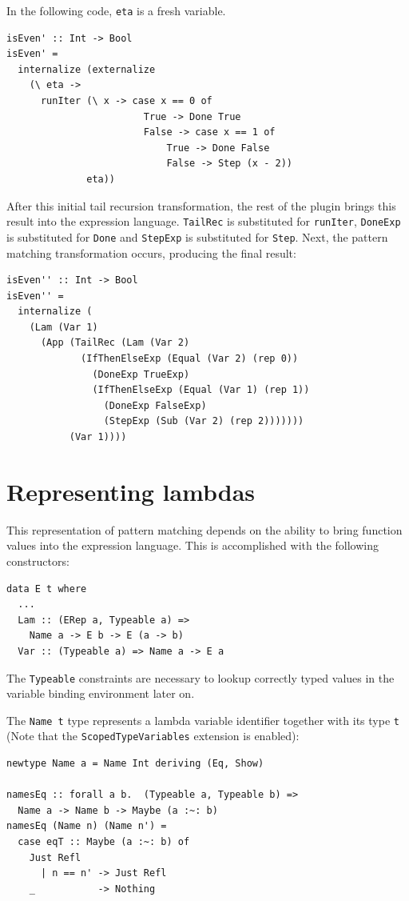 \documentclass[runningheads, a4paper]{llncs}
\newcommand{\ttt}{\texttt}
\begin{document}
In the following code, \verb|eta| is a fresh variable.

\begin{lstlisting}
isEven' :: Int -> Bool
isEven' =
  internalize (externalize
    (\ eta ->
      runIter (\ x -> case x == 0 of
                        True -> Done True
                        False -> case x == 1 of
                            True -> Done False
                            False -> Step (x - 2))
              eta))
\end{lstlisting}

\noindent After this initial tail recursion transformation, the rest of the plugin brings this
result into the expression language. \verb|TailRec| is substituted for \verb|runIter|,
\verb|DoneExp| is substituted for \verb|Done| and \verb|StepExp| is substituted for \verb|Step|.
Next, the pattern matching transformation occurs, producing the final result:


\begin{lstlisting}
isEven'' :: Int -> Bool
isEven'' =
  internalize (
    (Lam (Var 1)
      (App (TailRec (Lam (Var 2)
             (IfThenElseExp (Equal (Var 2) (rep 0))
               (DoneExp TrueExp)
               (IfThenElseExp (Equal (Var 1) (rep 1))
                 (DoneExp FalseExp)
                 (StepExp (Sub (Var 2) (rep 2)))))))
           (Var 1))))
\end{lstlisting}

\section{Representing lambdas}
\label{sec:LamRep}

This representation of pattern matching depends on the ability to bring
function values into the expression language. This is accomplished
with the following constructors:

\begin{lstlisting}
data E t where
  ...
  Lam :: (ERep a, Typeable a) =>
    Name a -> E b -> E (a -> b)
  Var :: (Typeable a) => Name a -> E a
\end{lstlisting}

\noindent The \ttt{Typeable} constraints are necessary to lookup correctly typed
values in the variable binding environment later on.

The \ttt{Name t} type represents a lambda variable identifier together with its
type \ttt{t} (Note that the \ttt{ScopedTypeVariables} extension is enabled):

\begin{lstlisting}
newtype Name a = Name Int deriving (Eq, Show)

namesEq :: forall a b.  (Typeable a, Typeable b) =>
  Name a -> Name b -> Maybe (a :~: b)
namesEq (Name n) (Name n') =
  case eqT :: Maybe (a :~: b) of
    Just Refl
      | n == n' -> Just Refl
    _           -> Nothing
\end{lstlisting}
\end{document}
